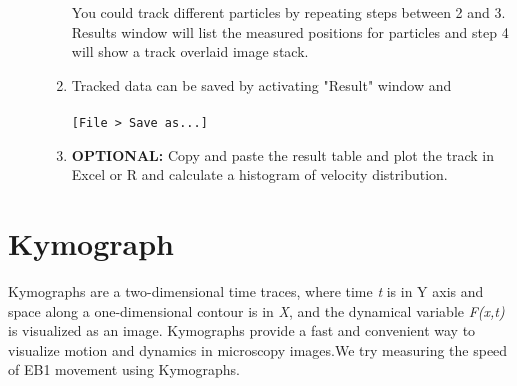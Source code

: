 \documentclass[11pnt]{article}
\begin{document}
\begin{description}
\begin{enumerate}
You could track different particles by repeating steps between 2 and 3. Results window will list the measured positions for particles and step 4 will show a track overlaid image stack.

\item Tracked data can be saved by activating "Result" window and 
\\
\\
\verb"[File > Save as...]"
\\
\item \textbf{OPTIONAL:} Copy and paste the result table and plot the track in Excel or R and calculate a histogram of velocity distribution.
\end{enumerate}

\end{description}

\section{Kymograph}

Kymographs are a two-dimensional time traces, where time \textit{t} is in Y axis and space along a one-dimensional contour is in \textit{X}, and the dynamical variable \textit{F(x,t) }is
visualized as an image. Kymographs provide a fast and convenient way to
visualize motion and dynamics in microscopy images.We try measuring the speed of EB1 movement using Kymographs. 
\end{document}

